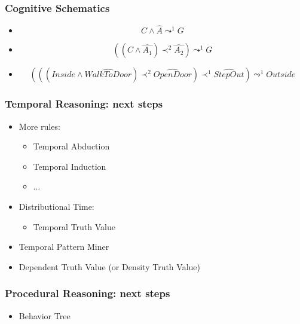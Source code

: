 \documentclass[aspectratio=169]{beamer}
\begin{document}
\begin{frame}
  \frametitle{Cognitive Schematics}

  \begin{itemize}
  \item<+-> $$C \wedge \widehat{A} \leadsto^{1} G$$
  \item<+-> $$((C \wedge \widehat{A_1}) \prec^{2} \widehat{A_2}) \leadsto^{1} G$$
  \item<+-> $$(((Inside \wedge \widehat{WalkToDoor}) \prec^{2}
    \widehat{OpenDoor}) \prec^{1} \widehat{StepOut}) \leadsto^{1} Outside$$
  \end{itemize}

\end{frame}

\begin{frame}
  \frametitle{Temporal Reasoning: next steps}
  \begin{itemize}
  \item<+-> More rules:
    \begin{itemize}
    \item Temporal Abduction
    \item Temporal Induction
    \item $\dots$
    \end{itemize}
  \item<+-> Distributional Time:
    \begin{itemize}
    \item Temporal Truth Value
    \end{itemize}
  \item<+-> Temporal Pattern Miner
  \item<+-> Dependent Truth Value (or Density Truth Value)
  \end{itemize}
\end{frame}

\begin{frame}
  \frametitle{Procedural Reasoning: next steps}
  \begin{itemize}
  \item<+-> Behavior Tree
  \end{itemize}
\end{frame}
\end{document}
